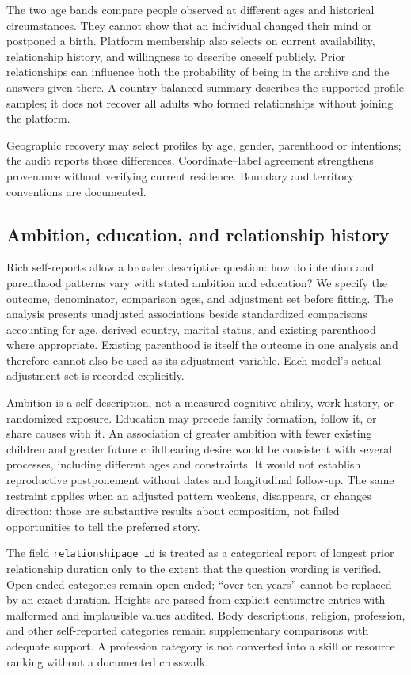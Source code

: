 The two age bands compare people observed at different ages and historical circumstances. They cannot show that an individual changed their mind or postponed a birth. Platform membership also selects on current availability, relationship history, and willingness to describe oneself publicly. Prior relationships can influence both the probability of being in the archive and the answers given there. A country-balanced summary describes the supported profile samples; it does not recover all adults who formed relationships without joining the platform.

Geographic recovery may select profiles by age, gender, parenthood or intentions; the audit reports those differences. Coordinate--label agreement strengthens provenance without verifying current residence. Boundary and territory conventions are documented.

\subsection{Ambition, education, and relationship history}

Rich self-reports allow a broader descriptive question: how do intention and parenthood patterns vary with stated ambition and education? We specify the outcome, denominator, comparison ages, and adjustment set before fitting. The analysis presents unadjusted associations beside standardized comparisons accounting for age, derived country, marital status, and existing parenthood where appropriate. Existing parenthood is itself the outcome in one analysis and therefore cannot also be used as its adjustment variable. Each model's actual adjustment set is recorded explicitly.

Ambition is a self-description, not a measured cognitive ability, work history, or randomized exposure. Education may precede family formation, follow it, or share causes with it. An association of greater ambition with fewer existing children and greater future childbearing desire would be consistent with several processes, including different ages and constraints. It would not establish reproductive postponement without dates and longitudinal follow-up. The same restraint applies when an adjusted pattern weakens, disappears, or changes direction: those are substantive results about composition, not failed opportunities to tell the preferred story.

The field \texttt{relationshipage\_id} is treated as a categorical report of longest prior relationship duration only to the extent that the question wording is verified. Open-ended categories remain open-ended; ``over ten years'' cannot be replaced by an exact duration. Heights are parsed from explicit centimetre entries with malformed and implausible values audited. Body descriptions, religion, profession, and other self-reported categories remain supplementary comparisons with adequate support. A profession category is not converted into a skill or resource ranking without a documented crosswalk.

